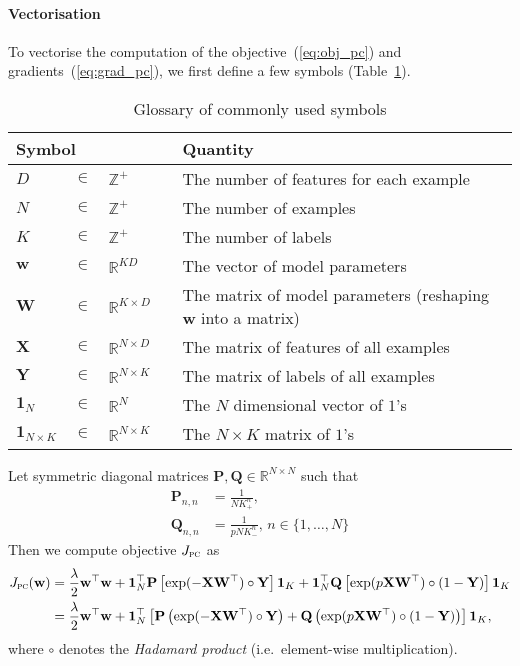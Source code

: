 \documentclass[9pt]{extarticle}
\newcommand{\1}{\mathbf{1}}
\newcommand{\w}{\mathbf{w}}
\newcommand{\Pb}{\mathbf{P}}
\newcommand{\Q}{\mathbf{Q}}
\newcommand{\W}{\mathbf{W}}
\newcommand{\X}{\mathbf{X}}
\newcommand{\Y}{\mathbf{Y}}
\newcommand{\R}{\mathbb{R}}
\newcommand{\Z}{\mathbb{Z}}
\newcommand{\one}{\mathbf{1}}
\newcommand{\ie}{i.e.\ }
\begin{document}
\paragraph{Vectorisation}
To vectorise the computation of the objective~(\ref{eq:obj_pc}) and gradients~(\ref{eq:grad_pc}), 
we first define a few symbols (Table~\ref{tab:symbols}).
\begin{table}[!h]
\caption{Glossary of commonly used symbols}
\label{tab:symbols}
\renewcommand{\arraystretch}{1.5} %
\setlength{\tabcolsep}{1pt} %
\centering
\begin{tabular}{llll}
\toprule
\multicolumn{3}{l}{\textbf{Symbol}} & \textbf{Quantity} \\ \hline 
$D$        &  $\in$  &  $\Z^+$            & The number of features for each example \\
$N$        &  $\in$  &  $\Z^+$            & The number of examples \\
$K$        &  $\in$  &  $\Z^+$            & The number of labels \\
$\w$       &  $\in$  &  $\R^{K D}$        & The vector of model parameters \\
$\W$       &  $\in$  &  $\R^{K \times D}$ & The matrix of model parameters (reshaping $\w$ into a matrix) \\
$\X$       &  $\in$  &  $\R^{N \times D}$ & The matrix of features of all examples \\
$\Y$       &  $\in$  &  $\R^{N \times K}$ & The matrix of labels of all examples \\
$\one_N$   &  $\in$  &  $\R^N$            & The $N$ dimensional vector of $1$'s \\
$\one_{N \times K}$  &  $\in$  &  $\R^{N \times K} \quad$  & The $N \times K$ matrix of $1$'s \\
\bottomrule
\end{tabular}
\end{table}

Let symmetric diagonal matrices $\Pb, \Q \in \R^{N \times N}$ such that
\begin{align*}
\Pb_{n,n} &= \frac{1}{N K_+^n}, \\
\Q_{n,n}  &= \frac{1}{p N K_-^n}, \, n \in \{1,\dots,N\}
\end{align*}
Then we compute objective $J_\textsc{pc}$ as
\begin{align*}
J_\textsc{pc}(\w) 
&= \frac{\lambda}{2} \w^\top \w + 
   \one_N^\top \Pb \left[ \exp(- \X \W^\top) \circ \Y     \right] \one_K +
   \one_N^\top \Q  \left[ \exp(p \X \W^\top) \circ (1-\Y) \right] \one_K \\
&= \frac{\lambda}{2} \w^\top \w + 
   \one_N^\top \left[ \Pb \left( \exp(-\X \W^\top) \circ \Y \right) + \Q \left( \exp(p \X \W^\top) \circ (1-\Y) \right) \right] \one_K,
\end{align*}
where $\circ$ denotes the \emph{Hadamard product} (\ie element-wise multiplication).
\end{document}

